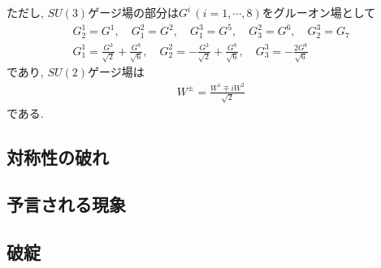 ただし, $SU(3)$ゲージ場の部分は$G^i\,(i=1,\cdots,8)$をグルーオン場として
\begin{align}
  G^1_2 = G^1,\quad G^2_1 = G^2,\quad G^3_1 = G^5,\quad G^2_3 = G^6,\quad G^3_2 = G_7\nonumber\\
  G^1_1 = \frac{G^3}{\sqrt{2}} + \frac{G^8}{\sqrt{6}},\quad G^2_2=-\frac{G^3}{\sqrt{2}}+\frac{G^8}{\sqrt{6}},\quad G^3_3 = -\frac{2G^8}{\sqrt{6}}\nonumber
\end{align}
であり, $SU(2)$ゲージ場は
\begin{align}
  W^\pm = \frac{W^1\mp iW^2}{\sqrt{2}}\nonumber
\end{align}
である.
\subsection{対称性の破れ}
\subsection{予言される現象}
\subsection{破綻}


